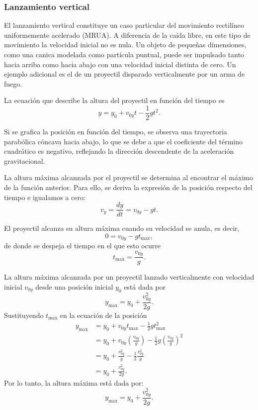 \subsubsection{Lanzamiento vertical}

El lanzamiento vertical constituye un caso particular del movimiento rectilíneo uniformemente acelerado (MRUA). A diferencia de la caída libre, en este tipo de movimiento la velocidad inicial no es nula. Un objeto de pequeñas dimensiones, como una canica modelada como partícula puntual, puede ser impulsado tanto hacia arriba como hacia abajo con una velocidad inicial distinta de cero. Un ejemplo adicional es el de un proyectil disparado verticalmente por un arma de fuego.

La ecuación que describe la altura del proyectil en función del tiempo es
$$y = y_0 + v_{0y}t - \frac{1}{2}gt^2.$$

Si se grafica la posición en función del tiempo, se observa una trayectoria parabólica cóncava hacia abajo, lo que se debe a que el coeficiente del término cuadrático es negativo, reflejando la dirección descendente de la aceleración gravitacional.

La altura máxima alcanzada por el proyectil se determina al encontrar el máximo de la función anterior. Para ello, se deriva la expresión de la posición respecto del tiempo e igualamos a cero:
$$v_y = \frac{dy}{dt} = v_{0y} - gt.$$

El proyectil alcanza su altura máxima cuando su velocidad se anula, es decir,
$$0 = v_{0y} - gt_{\max},$$
de donde se despeja el tiempo en el que esto ocurre
$$t_{\max} = \frac{v_{0y}}{g}.$$

\begin{proposition}{}{}
    La altura máxima alcanzada por un proyectil lanzado verticalmente con velocidad inicial $v_{0y}$ desde una posición inicial $y_0$ está dada por
    $$y_{\max} = y_0 + \frac{v_{0y}^2}{2g}.$$
    \dem Sustituyendo $t_{\max}$ en la ecuación de la posición
        \begin{align*}
            y_{\max} & = y_0 + v_{0y}t_{\max} - \frac{1}{2}g t_{\max}^2 \\
            & = y_0 + v_{0y}\left(\frac{v_{0y}}{g}\right) - \frac{1}{2}g \left(\frac{v_{0y}}{g}\right)^2 \\
            & = y_0 + \frac{v_{0y}^2}{g} - \frac{1}{2} \frac{v_{0y}^2}{g} \\
            & = y_0 + \frac{v_{0y}^2}{2g}.
        \end{align*}
        Por lo tanto, la altura máxima está dada por:
        \begin{equation*}
            y_{\max} = y_0 + \frac{v_{0y}^2}{2g}. \tag*{\BlackSquare}
        \end{equation*}
\end{proposition}

